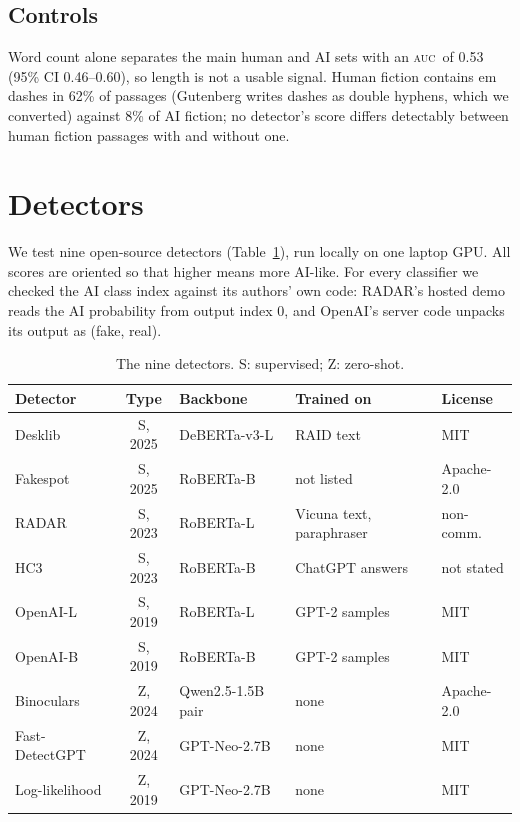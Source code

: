 \documentclass[conference]{IEEEtran}
\newcommand{\auc}{\textsc{auc}}
\begin{document}
\subsection{Controls}
Word count alone separates the main human and AI sets with an \auc\ of 0.53 (95\% CI 0.46--0.60), so length is not a usable signal. Human fiction contains em dashes in 62\% of passages (Gutenberg writes dashes as double hyphens, which we converted) against 8\% of AI fiction; no detector's score differs detectably between human fiction passages with and without one.

\section{Detectors}
We test nine open-source detectors (Table~\ref{tab:detectors}), run locally on one laptop GPU. All scores are oriented so that higher means more AI-like. For every classifier we checked the AI class index against its authors' own code: RADAR's hosted demo reads the AI probability from output index 0, and OpenAI's server code unpacks its output as (fake, real).

\begin{table}[t]
\caption{The nine detectors. S: supervised; Z: zero-shot.}
\label{tab:detectors}
\centering
\footnotesize
\begin{tabular}{@{}lclll@{}}
\toprule
Detector & Type & Backbone & Trained on & License \\
\midrule
Desklib \cite{desklib} & S, 2025 & DeBERTa-v3-L \cite{deberta} & RAID text \cite{raid} & MIT \\
Fakespot \cite{fakespot} & S, 2025 & RoBERTa-B \cite{roberta} & not listed & Apache-2.0 \\
RADAR \cite{radar} & S, 2023 & RoBERTa-L & Vicuna text, paraphraser & non-comm. \\
HC3 \cite{hc3} & S, 2023 & RoBERTa-B & ChatGPT answers & not stated \\
OpenAI-L \cite{solaiman} & S, 2019 & RoBERTa-L & GPT-2 samples & MIT \\
OpenAI-B \cite{solaiman} & S, 2019 & RoBERTa-B & GPT-2 samples & MIT \\
Binoculars \cite{binoculars} & Z, 2024 & Qwen2.5-1.5B pair \cite{qwen} & none & Apache-2.0 \\
Fast-DetectGPT \cite{fastdetectgpt} & Z, 2024 & GPT-Neo-2.7B \cite{gptneo} & none & MIT \\
Log-likelihood \cite{gltr} & Z, 2019 & GPT-Neo-2.7B & none & MIT \\
\bottomrule
\end{tabular}
\end{table}
\end{document}

